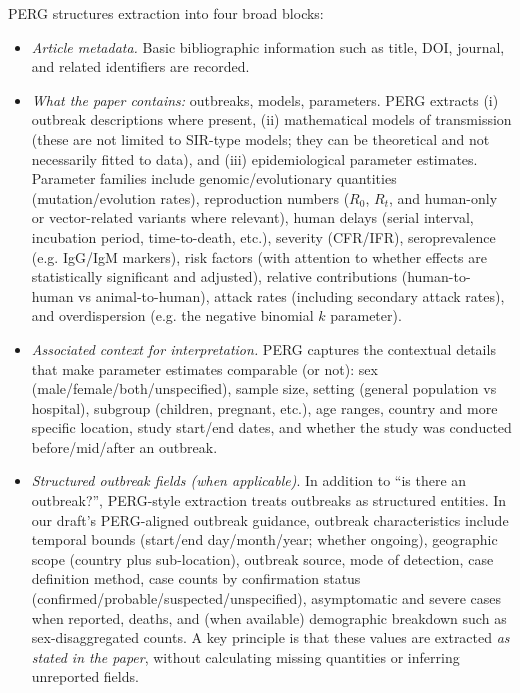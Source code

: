 PERG structures extraction into four broad blocks:
\vspace{-10pt}
\begin{itemize}[leftmargin=*, itemsep=-3pt]
    \item  \textit{Article metadata.} Basic bibliographic information such as title, DOI, journal, and related identifiers are recorded. 
    \item  \textit{What the paper contains:} outbreaks, models, parameters. PERG extracts (i) outbreak descriptions where present, (ii) mathematical models of transmission (these are not limited to SIR-type models; they can be theoretical and not necessarily fitted to data), and (iii) epidemiological parameter estimates. Parameter families include genomic/evolutionary quantities (mutation/evolution rates), reproduction numbers ($R_0$, $R_t$, and human-only or vector-related variants where relevant), human delays (serial interval, incubation period, time-to-death, etc.), severity (CFR/IFR), seroprevalence (e.g. IgG/IgM markers), risk factors (with attention to whether effects are statistically significant and adjusted), relative contributions (human-to-human vs animal-to-human), attack rates (including secondary attack rates), and overdispersion (e.g. the negative binomial $k$ parameter). 
    \item \textit{Associated context for interpretation.} PERG captures the contextual details that make parameter estimates comparable (or not): sex (male/female/both/unspecified), sample size, setting (general population vs hospital), subgroup (children, pregnant, etc.), age ranges, country and more specific location, study start/end dates, and whether the study was conducted before/mid/after an outbreak.
    \item \textit{Structured outbreak fields (when applicable)}. In addition to “is there an outbreak?”, PERG-style extraction treats outbreaks as structured entities. In our draft’s PERG-aligned outbreak guidance, outbreak characteristics include temporal bounds (start/end day/month/year; whether ongoing), geographic scope (country plus sub-location), outbreak source, mode of detection, case definition method, case counts by confirmation status (confirmed/probable/suspected/unspecified), asymptomatic and severe cases when reported, deaths, and (when available) demographic breakdown such as sex-disaggregated counts. A key principle is that these values are extracted \emph{as stated in the paper}, without calculating missing quantities or inferring unreported fields.
\end{itemize}


